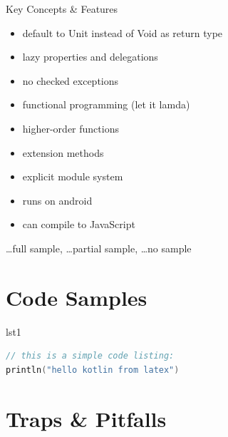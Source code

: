 \begin{frame}{Key Concepts \& Features}
	\begin{itemize}
		\item default to Unit instead of Void as return type \xmark 
		\item lazy properties and delegations \cmark
		\item no checked exceptions \xmark
		\item functional programming (let it lamda) \tmark
		\item higher-order functions \tmark
		\item extension methods \cmark
		\item explicit module system \xmark
		\item runs on android \xmark
		\item can compile to JavaScript \xmark
	\end{itemize}
\cmark \dots full sample, \tmark \dots partial sample, \xmark \dots no sample
\end{frame}

\section{Code Samples}

\begin{frame}[fragile]{lst1}
\begin{lstlisting}[caption={Simple code listing.}, label={lst:example1}, language=Kotlin]
// this is a simple code listing:
println("hello kotlin from latex")
\end{lstlisting}
\end{frame}

\section{Traps \& Pitfalls}

